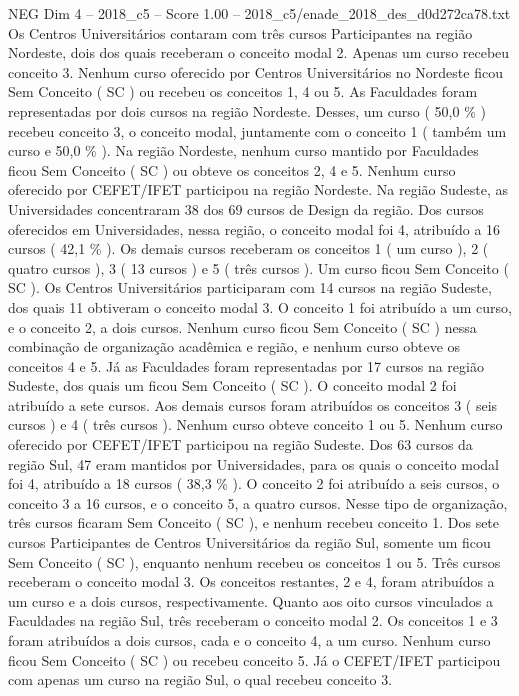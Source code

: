 \begin{textsample}{NEG Dim 4 – 2018\_c5 – Score 1.00 – 2018\_c5/enade\_2018\_des\_d0d272ca78.txt}
Os Centros Universitários contaram com três cursos Participantes na região Nordeste, dois dos quais receberam o conceito modal 2.
Apenas um curso recebeu conceito 3.
Nenhum curso oferecido por Centros Universitários no Nordeste ficou Sem Conceito ( SC ) ou recebeu os conceitos 1, 4 ou 5.
As Faculdades foram representadas por dois cursos na região Nordeste.
Desses, um curso ( 50,0 \% ) recebeu conceito 3, o conceito modal, juntamente com o conceito 1 ( também um curso e 50,0 \% ).
Na região Nordeste, nenhum curso mantido por Faculdades ficou Sem Conceito ( SC ) ou obteve os conceitos 2, 4 e 5.
Nenhum curso oferecido por CEFET/IFET participou na região Nordeste.
Na região Sudeste, as Universidades concentraram 38 dos 69 cursos de Design da região.
Dos cursos oferecidos em Universidades, nessa região, o conceito modal foi 4, atribuído a 16 cursos ( 42,1 \% ).
Os demais cursos receberam os conceitos 1 ( um curso ), 2 ( quatro cursos ), 3 ( 13 cursos ) e 5 ( três cursos ).
Um curso ficou Sem Conceito ( SC ).
Os Centros Universitários participaram com 14 cursos na região Sudeste, dos quais 11 obtiveram o conceito modal 3.
O conceito 1 foi atribuído a um curso, e o conceito 2, a dois cursos.
Nenhum curso ficou Sem Conceito ( SC ) nessa combinação de organização acadêmica e região, e nenhum curso obteve os conceitos 4 e 5.
Já as Faculdades foram representadas por 17 cursos na região Sudeste, dos quais um ficou Sem Conceito ( SC ).
O conceito modal 2 foi atribuído a sete cursos.
Aos demais cursos foram atribuídos os conceitos 3 ( seis cursos ) e 4 ( três cursos ).
Nenhum curso obteve conceito 1 ou 5.
Nenhum curso oferecido por CEFET/IFET participou na região Sudeste.
Dos 63 cursos da região Sul, 47 eram mantidos por Universidades, para os quais o conceito modal foi 4, atribuído a 18 cursos ( 38,3 \% ).
O conceito 2 foi atribuído a seis cursos, o conceito 3 a 16 cursos, e o conceito 5, a quatro cursos.
Nesse tipo de organização, três cursos ficaram Sem Conceito ( SC ), e nenhum recebeu conceito 1.
Dos sete cursos Participantes de Centros Universitários da região Sul, somente um ficou Sem Conceito ( SC ), enquanto nenhum recebeu os conceitos 1 ou 5.
Três cursos receberam o conceito modal 3.
Os conceitos restantes, 2 e 4, foram atribuídos a um curso e a dois cursos, respectivamente.
Quanto aos oito cursos vinculados a Faculdades na região Sul, três receberam o conceito modal 2.
Os conceitos 1 e 3 foram atribuídos a dois cursos, cada e o conceito 4, a um curso.
Nenhum curso ficou Sem Conceito ( SC ) ou recebeu conceito 5.
Já o CEFET/IFET participou com apenas um curso na região Sul, o qual recebeu conceito 3.

\end{textsample}
